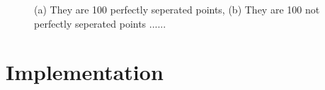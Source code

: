 \documentclass[letterpaper]{article}
\begin{document}
\begin{figure}[!htb]
\begin{center}

\caption{(a) They are 100 perfectly seperated points, (b) They are 100 not perfectly seperated points ...... }
\label{fig1}
\end{center}
\end{figure}


\section{Implementation}
\end{document}
